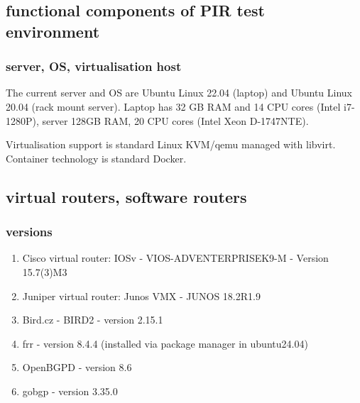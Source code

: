 

\NH{\rule{14cm}{0.4pt}}



\subsection{functional components of PIR test environment}

\subsubsection{server, OS, virtualisation host}

The current server and OS are Ubuntu Linux 22.04 (laptop) and Ubuntu Linux 20.04 (rack mount server).
Laptop has 32 GB RAM and 14 CPU cores (Intel i7-1280P), server 128GB RAM, 20 CPU cores (Intel Xeon D-1747NTE).

Virtualisation support is standard Linux KVM/qemu managed with libvirt.
Container technology is standard Docker.

\subsection{virtual routers, software routers}
\subsubsection{versions}

\begin{enumerate}
\item Cisco virtual router: IOSv - VIOS-ADVENTERPRISEK9-M - Version 15.7(3)M3
\item Juniper virtual router: Junos VMX - JUNOS 18.2R1.9
\item Bird.cz - BIRD2 - version 2.15.1
\item frr - version 8.4.4 (installed via package manager in ubuntu24.04)
\item OpenBGPD - version 8.6
\item gobgp - version 3.35.0
\end{enumerate}

